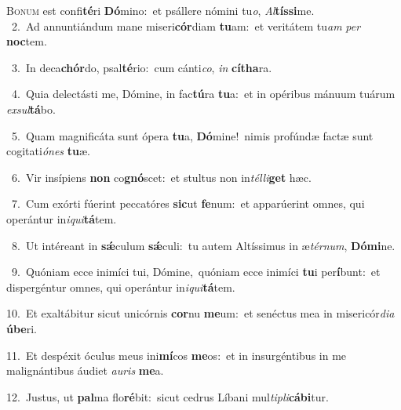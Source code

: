 \lettrine{\initial\textcolor{\initialcolor}{B}}{onum} est confi\-\textbf{té}\-ri \textbf{Dó}\-mino:~\star et psállere nómini tu\-\textit{o}\-, \textit{Al}\-\textbf{tís}\textbf{si}me.\\
{\numbfont\textcolor{\numbcolor}{~2.}}~Ad annuntiándum mane miseri\-\textbf{cór}\-diam \textbf{tu}\-am:~\star et veritátem tu\textit{am} \textit{per} \textbf{noc}\-tem.\par
{\numbfont\textcolor{\numbcolor}{~3.}}~In deca\-\textbf{chór}\-do, psal\-\textbf{té}\-rio:~\star cum cánti\-\textit{co}\-, \textit{in} \textbf{cí}\-\textbf{tha}ra.\par
{\numbfont\textcolor{\numbcolor}{~4.}}~Quia delectásti me, Dómine, in fac\-\textbf{tú}\-ra \textbf{tu}\-a:~\star et in opéribus mánuum tuárum \textit{ex}\-\textit{sul}\textbf{tá}bo.\par
{\numbfont\textcolor{\numbcolor}{~5.}}~Quam magnificáta sunt ópera \textbf{tu}\-a, \textbf{Dó}\-mine!~\star nimis profúndæ factæ sunt cogitati\-\textit{ó}\-\textit{nes} \textbf{tu}\-æ.\par
{\numbfont\textcolor{\numbcolor}{~6.}}~Vir insípiens \textbf{non} co\-\textbf{gnó}\-scet:~\star et stultus non in\-\textit{tél}\-\textit{li}\textbf{get} hæc.\par
{\numbfont\textcolor{\numbcolor}{~7.}}~Cum exórti fúerint peccatóres \textbf{sic}\-ut \textbf{fe}\-num:~\star et apparúerint omnes, qui operántur in\-\textit{i}\-\textit{qui}\textbf{tá}tem.\par
{\numbfont\textcolor{\numbcolor}{~8.}}~Ut intéreant in \textbf{sǽ}\-culum \textbf{sǽ}\-culi:~\star tu autem Altíssimus in æ\-\textit{tér}\-\textit{num}, \textbf{Dó}\-\textbf{mi}ne.\par
{\numbfont\textcolor{\numbcolor}{~9.}}~Quóniam ecce inimíci tui, Dómine,~\dagger quóniam ecce inimíci \textbf{tu}\-i per\-\textbf{í}\-bunt:~\star et dispergéntur omnes, qui operántur in\-\textit{i}\-\textit{qui}\textbf{tá}tem.\par
{\numbfont\textcolor{\numbcolor}{10.}}~Et exaltábitur sicut unicórnis \textbf{cor}\-nu \textbf{me}\-um:~\star et senéctus mea in misericór\-\textit{di}\-\textit{a} \textbf{ú}\-\textbf{be}ri.\par
{\numbfont\textcolor{\numbcolor}{11.}}~Et despéxit óculus meus ini\-\textbf{mí}\-cos \textbf{me}\-os:~\star et in insurgéntibus in me malignántibus áudiet \textit{au}\-\textit{ris} \textbf{me}\-a.\par
{\numbfont\textcolor{\numbcolor}{12.}}~Justus, ut \textbf{pal}\-ma flo\-\textbf{ré}\-bit:~\star sicut cedrus Líbani mul\-\textit{ti}\-\textit{pli}\textbf{cá}\textbf{bi}tur.\par
